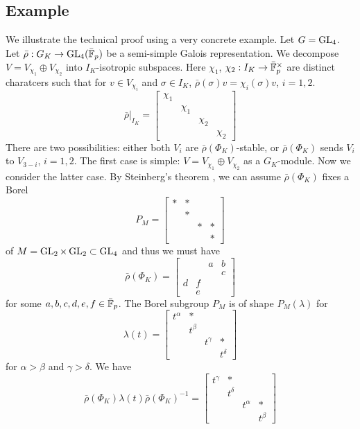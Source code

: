 \documentclass[10pt,a4paper,twoside]{article}
\begin{document}
\subsection{Example}
We illustrate the technical proof using a very concrete example.
Let $G=\operatorname{GL}_4$.
Let $\bar\rho:G_K \to \operatorname{GL}_4(\bar{\mathbb{F}}_p)$ be a semi-simple Galois representation.
We decompose $V=V_{\chi_1}\oplus V_{\chi_2}$ into $I_K$-isotropic subspaces.
Here $\chi_1$, $\chi_2:I_K \to \bar{\mathbb{F}}_p^\times$ are distinct charatcers 
such that for $v\in V_{\chi_i}$ and $\sigma\in I_K$,
$\bar\rho(\sigma)v = \chi_i(\sigma)v$, $i=1,2$.
$$
\bar\rho|_{I_K} = 
\begin{bmatrix}
\chi_1 & & & \\
& \chi_1 & & \\
& & \chi_2 & \\
& & & \chi_2
\end{bmatrix}
$$
There are two possibilities: either both $V_i$ are $\bar\rho(\Phi_K)$-stable, or
$\bar\rho(\Phi_K)$ sends $V_i$ to $V_{3-i}$, $i=1,2$.
The first case is simple: $V=V_{\chi_1}\oplus V_{\chi_2}$ as a $G_K$-module. 
Now we consider the latter case.
By Steinberg's theorem \cite[Theorem 7.2]{St68}, we can assume
$\bar\rho(\Phi_K)$ fixes a Borel
$$
P_M = \begin{bmatrix}
* & * & & \\
& * & & \\
& & * & * \\
& & & *
\end{bmatrix}
$$
of $M=\operatorname{GL}_2 \times \operatorname{GL}_2 \subset \operatorname{GL}_4$ and thus we must have
$$
\bar\rho(\Phi_K) = 
\begin{bmatrix}
 & & a & b \\
 & & & c \\
 d & f & & \\
 & e & &
\end{bmatrix}
$$
for some $a,b,c,d,e,f\in \bar{\mathbb{F}}_p$.
The Borel subgroup $P_M$ is of shape $P_M(\lambda)$
for 
$$
\lambda(t) = \begin{bmatrix}
t^{\alpha} & * & & \\
& t^{\beta} & & \\
& & t^{\gamma} & * \\
& & & t^{\delta}
\end{bmatrix}
$$
for $\alpha > \beta$ and $\gamma > \delta$.
We have
$$
\bar\rho(\Phi_K)\lambda(t)\bar\rho(\Phi_K)^{-1} = \begin{bmatrix}
t^{\gamma} & * & & \\
& t^{\delta} & & \\
& & t^{\alpha} & * \\
& & & t^{\beta}
\end{bmatrix}
$$
\end{document}

